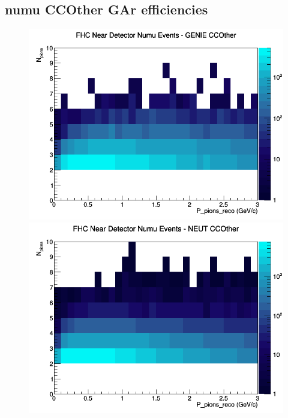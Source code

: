 \documentclass[12pt]{article}
\begin{document}
\subsection{numu CCOther GAr efficiencies}
\begin{figure}[h]
\includegraphics[width=\linewidth]{eff_N_P/GAr/pions/CCOther_FHC_ND_numu_N_P_GENIE.png}
\endminipage
{}
\includegraphics[width=\linewidth]{eff_N_P/GAr/pions/CCOther_FHC_ND_numu_N_P_NEUT.png}
\endminipage
{}

\end{figure}
\end{document}
